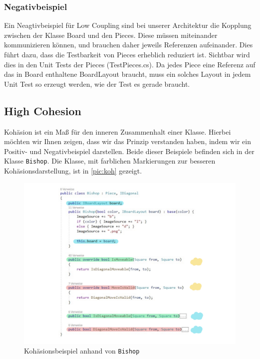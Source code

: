 \documentclass[
10pt, %
a4paper, %
oneside, %
headinclude,footinclude, %
BCOR5mm, %
]{scrartcl}
\begin{document}
\begin{onehalfspace}
\subsubsection{Negativbeispiel}
Ein Neagtivbeispiel für Low Coupling sind bei unserer Architektur die Kopplung zwischen der Klasse Board und den Pieces. Diese müssen miteinander kommunizieren können, und brauchen daher jeweils Referenzen aufeinander. Dies führt dazu, dass die Testbarkeit von Pieces erheblich reduziert ist. Sichtbar wird dies in den Unit Tests der Pieces (TestPieces.cs). Da jedes Piece eine Referenz auf das in Board enthaltene BoardLayout braucht, muss ein solches Layout in jedem Unit Test so erzeugt werden, wie der Test es gerade braucht.

\subsection{High Cohesion}
Kohäsion ist ein Maß für den inneren Zusammenhalt einer Klasse. Hierbei möchten wir Ihnen zeigen, dass wir das Prinzip verstanden haben, indem wir ein Positiv- und Negativbeispiel darstellen. Beide dieser Beispiele befinden sich in der Klasse \texttt{Bishop}. Die Klasse, mit farblichen Markierungen zur besseren Kohäsionsdarstellung, ist in \autoref{pic:koh} gezeigt.

\begin{figure}[h]
	\begin{center}
		\includegraphics[width=\textwidth]{Kohaesion.pdf}
		\caption{\label{pic:koh} Kohäsionsbeispiel anhand von \texttt{Bishop}}
	\end{center}
\end{figure}


\end{onehalfspace}
\end{document}
